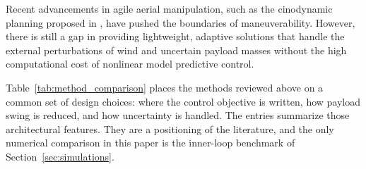 \documentclass[sn-mathphys-num]{sn-jnl}
\theoremstyle{thmstyleone}%
\theoremstyle{thmstyletwo}%
\theoremstyle{thmstylethree}%
\begin{document}
Recent advancements in agile aerial manipulation, such as the cinodynamic planning proposed in \cite{sun2025agile}, have pushed the boundaries of maneuverability. However, there is still a gap in providing lightweight, adaptive solutions that handle the external perturbations of wind and uncertain payload masses without the high computational cost of nonlinear model predictive control.

Table~\ref{tab:method_comparison} places the methods reviewed above on a common set of design choices: where the control objective is written, how payload swing is reduced, and how uncertainty is handled. The entries summarize those architectural features. They are a positioning of the literature, and the only numerical comparison in this paper is the inner-loop benchmark of Section~\ref{sec:simulations}.
\end{document}
